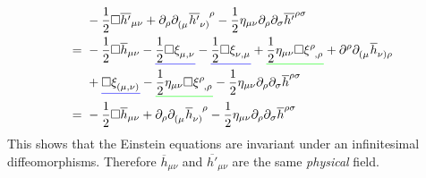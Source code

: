 \begin{equation}
    \begin{split}
        & -\frac{1}{2} \Box \overline{h'}_{\mu\nu} + \partial_\rho \tensor{\partial}{_(_\mu}\tensor{\overline{h'}}{_\nu_)^\rho}
        - \frac{1}{2} \eta_{\mu\nu}\partial_\rho\partial_\sigma \overline{h'}^{\rho\sigma} \\
        =\ & -\frac{1}{2}\Box\overline{h}_{\mu\nu} - \mathunderline{blue}{\frac{1}{2}\Box\tensor{\xi}{_\mu_,_\nu}}
        -\mathunderline{blue}{\frac{1}{2}\Box\tensor{\xi}{_\nu_,_\mu}} 
        + \mathunderline{green}{\frac{1}{2} \eta_{\mu\nu}\Box\tensor{\xi}{^\rho_,_\rho}} 
        + \partial^\rho \tensor{\partial}{_(_\mu}\tensor{\overline{h}}{_\nu_)_\rho} \\
        & + \mathunderline{blue}{\Box\tensor{\xi}{_(_\mu_,_\nu_)}} 
        - \mathunderline{green}{\frac{1}{2}\eta_{\mu\nu}\Box\tensor{\xi}{^\rho_,_\rho}} 
        - \frac{1}{2} \eta_{\mu\nu}\partial_\rho\partial_\sigma \overline{h}^{\rho\sigma} \\
        =\ & -\frac{1}{2} \Box \overline{h}_{\mu\nu} + \partial_\rho \tensor{\partial}{_(_\mu}\tensor{\overline{h}}{_\nu_)^\rho}
        - \frac{1}{2} \eta_{\mu\nu}\partial_\rho\partial_\sigma \overline{h}^{\rho\sigma}
    \end{split}
\end{equation}
This shows that the Einstein equations are invariant under an infinitesimal diffeomorphisms. 
Therefore $\overline{h}_{\mu\nu}$ and $\overline{h'}_{\mu\nu}$ are the same \emph{physical} field.

